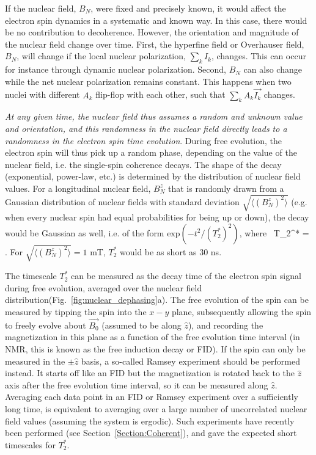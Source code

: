 \documentclass[rmp,twocolumn,aps]{revtex4}
\begin{document}
If the nuclear field, $B_N$, were fixed and precisely
known, it would affect the electron spin dynamics in a systematic
and known way. In this case, there would be no contribution to
decoherence. However, the orientation and magnitude of the nuclear
field change over time. First, the hyperfine field or Overhauser
field, $B_N$, will change if the local nuclear polarization,
$\sum_k I_k$, changes. This can occur for instance through dynamic 
nuclear polarization. Second, $B_N$ can also change while the net 
nuclear polarization remains
constant. This happens when two nuclei with different $A_k$
flip-flop with each other, such that $\sum_k A_k \vec{I_k}$
changes.

\emph{At any given time, the nuclear field thus assumes a random
and unknown value and orientation, and this randomness in the
nuclear field directly leads to a randomness in the electron spin
time evolution}. During free evolution, the electron spin will
thus pick up a random phase, depending on the value of the nuclear
field, i.e. the single-spin coherence decays. The shape of the decay (exponential, power-law, etc.) is determined by the distribution of nuclear field values. For a longitudinal nuclear field, $B_N^z$ that is randomly
drawn from a Gaussian distribution of nuclear fields with standard
deviation $\sqrt{\langle(B_N^z)^2\rangle}$ (e.g. when every
nuclear spin had equal probabilities for being up or down), the decay would be Gaussian as well, i.e. of the form $\mbox{exp}(-t^2/(T_2^*)^2)$, where~\cite{merkulov02} 
\be
T_2^* =  \;.
\ee 
For $\sqrt{\langle(B_N^z)^2\rangle} = 1$ mT, $T_2^*$ would be as short as $30$ ns. 

The timescale $T_2^*$ can be measured as the decay time of the electron spin signal during free evolution, averaged over the nuclear field distribution(Fig.~\ref{fig:nuclear_dephasing}a). The free evolution of the spin can be measured by tipping the spin into the $x-y$ plane, subsequently allowing the spin to freely evolve about $\vec{B_0}$ (assumed to be along $\hat{z}$), and recording the magnetization in this plane as a function of the free evolution time interval (in NMR, this is known as the free induction decay or FID).  If the spin can only be measured in the $\pm\hat{z}$ basis, a so-called Ramsey experiment should be performed instead. It starts off like an FID but the magnetization is rotated back to the $\hat{z}$ axis after the free evolution time interval, so it can be measured along $\hat{z}$. Averaging each data point in an FID or Ramsey experiment over a sufficiently long time, is equivalent to averaging over a large number of uncorrelated nuclear field values (assuming the system is ergodic). Such experiments have recently been performed (see Section~\ref{Section:Coherent}), and gave the expected short timescales for $T_2^*$.
\end{document}
